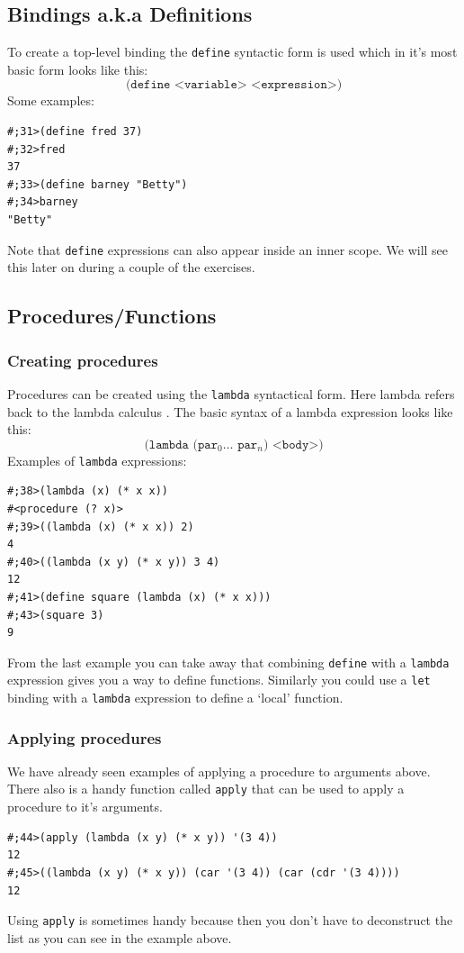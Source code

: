 \documentclass[12pt,a4paper,english,twoside]{article}
\begin{document}
\subsection{Bindings a.k.a Definitions}
To create a top-level binding the \texttt{define} syntactic form is used which 
in it's most basic form looks like this:
\begin{equation*}
\texttt{(define <variable> <expression>)}
\end{equation*}
Some examples:
\begin{lstlisting}
#;31>(define fred 37)
#;32>fred
37
#;33>(define barney "Betty")
#;34>barney
"Betty"
\end{lstlisting}
Note that \texttt{define} expressions can also appear inside an inner scope. 
We will see this later on during a couple of the exercises.
\subsection{Procedures/Functions}
\subsubsection{Creating procedures}
Procedures can be created using the \texttt{lambda} syntactical form. Here 
lambda refers back to the lambda calculus \cite{lambda}.
The basic syntax of a lambda expression looks like this:
\begin{equation*}
\texttt{(lambda (par$_{0} \dots$ par$_{n}$) <body>)}
\end{equation*}
Examples of \texttt{lambda} expressions:
\begin{lstlisting}
#;38>(lambda (x) (* x x))
#<procedure (? x)>
#;39>((lambda (x) (* x x)) 2)
4 
#;40>((lambda (x y) (* x y)) 3 4)
12
#;41>(define square (lambda (x) (* x x)))
#;43>(square 3)
9
\end{lstlisting}
From the last example you can take away that combining \texttt{define} with a 
\texttt{lambda} expression gives you a way to define functions. Similarly you 
could use a \texttt{let} binding with a \texttt{lambda} expression to define a 
`local' function.
\subsubsection{Applying procedures}
We have already seen examples of applying a procedure to arguments above. 
There also is a handy function called \texttt{apply} that can be used to apply 
a procedure to it's arguments.
\begin{lstlisting}
#;44>(apply (lambda (x y) (* x y)) '(3 4))
12
#;45>((lambda (x y) (* x y)) (car '(3 4)) (car (cdr '(3 4))))
12
\end{lstlisting} Using \texttt{apply} is sometimes handy because then you 
don't have to deconstruct the list as you can see in the example above.
\end{document}
